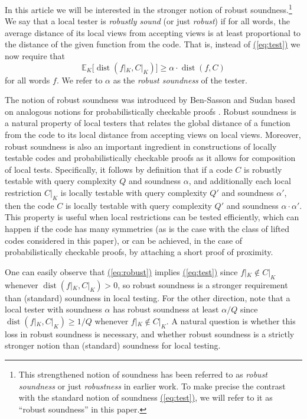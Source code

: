 \documentclass[11pt]{article}
\numberwithin{equation}{section}
\theoremstyle{definition}
\theoremstyle{plain}
\renewcommand{\eqref}[1]{\hyperref[#1]{(\ref*{#1})}}
\theoremstyle{plain}
\DeclareMathOperator{\dist}{dist} %
\newcommand{\E}{{\mathbb{E}}}
\begin{document}
In this %
article  %
we will be interested in the stronger notion of robust soundness.\footnote{This strengthened notion of soundness has been referred to as \emph{robust soundness} \cite{BenSassonGHSV2006,BenSassonS2006} or just \emph{robustness} \cite{GuoHS2015} in earlier
%
work.  %
To make precise the contrast with the standard notion of soundness \eqref{eq:test}, we will refer to %
it  %
as ``robust soundness''  in this
%
paper.}   %
We say that a local tester
%
%
%
is \emph{robustly sound} (or just \emph{robust}) if
%
for all words,   %
the average distance of its local views from accepting views is
at least  %
%
proportional to the distance of the given function from the code.
That is, 
%
%
%
%
%
instead of \eqref{eq:test} we now require that
\begin{equation}\label{eq:robust}
\E_K\big[\dist(f|_K,C|_K)\big] \geq \alpha \cdot \dist(f,C)
\end{equation}
%
for all words $f$.  %
%
%
We   %
refer to $\alpha$ as the \emph{robust soundness} 
of the tester.

The notion of robust soundness was introduced by Ben-Sasson and Sudan \cite{BenSassonS2006} based on analogous notions for probabilistically checkable proofs \cite{BenSassonGHSV2006,DinurR2006}.
Robust %
soundness   %
is a natural property of local testers that relates the global distance of a function from the code to its local distance from accepting views on local views. Moreover, robust soundness is also an important ingredient in constructions of locally testable codes and probabilistically checkable proofs as it allows for composition of local tests. Specifically, it follows by definition that if a code $C$ is robustly testable with query complexity $Q$ and soundness $\alpha$, and additionally each local restriction $C|_K$ is locally testable with query complexity $Q'$ and soundness $\alpha'$, then the code $C$ is locally testable with query complexity $Q'$ and soundness $\alpha \cdot \alpha'$. This property is useful when local restrictions can be tested efficiently, %
which can happen if the code has many symmetries (as is the case with
the class of lifted codes considered in this %
paper),  %
or can be achieved, in the case of probabilistically checkable
%
proofs,  %
by attaching a short proof of proximity.

One can easily observe that  \eqref{eq:robust} implies \eqref{eq:test} since $f|_K \notin C|_K$ whenever $\dist(f|_K,C|_K)>0$, so robust soundness is a stronger requirement than (standard) soundness in local testing. 
For the other direction, note that a local tester with soundness $\alpha$ has robust soundness at least $\alpha/Q$ since
$\dist(f|_K,C|_K) \geq 1/Q$ whenever $f|_K \notin C|_K$. A natural question is whether this loss in robust soundness is necessary, and whether robust soundness is
a  %
strictly stronger notion than (standard) soundness for local testing.
\end{document}

